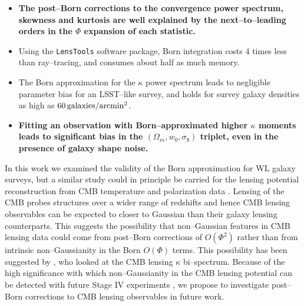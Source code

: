 \documentclass[reprint,aps,prd,superscriptaddress,showkeys,showpacs]{revtex4-1}
\newcommand{\ttt}[1]{\texttt{#1}}
\begin{document}
\begin{itemize}
\item \textbf{\color{blue} The post--Born corrections to the convergence power spectrum, skewness and kurtosis are well explained by the next--to--leading orders in the $\Phi$ expansion of each statistic.} 
\item Using the \ttt{LensTools} software package, Born integration costs 4 times less than ray--tracing, and consumes about half as much memory.
\item The Born approximation for the $\kappa$ power spectrum leads to negligible parameter bias for an LSST--like survey, and holds for survey galaxy densities as high as $60\,{\rm galaxies/arcmin^2}$.
\item \textbf{\color{red} Fitting an observation with Born--approximated higher $\kappa$ moments leads to significant bias in the $(\Omega_m,w_0,\sigma_8)$ triplet, even in the presence of galaxy shape noise.}    
\end{itemize}
%
In this work we examined the validity of the Born approximation for WL galaxy surveys, but a similar study could in principle be carried for the lensing potential reconstruction from CMB temperature and polarization data \citep{CMBCalabrese}. Lensing of the CMB probes structures over a wider range of redshifts and hence CMB lensing observables can be expected to closer to Gaussian than their galaxy lensing counterparts. This suggests the possibility that non--Gaussian features in CMB lensing data could come from post--Born corrections of $O(\Phi^2)$ rather than from intrinsic non--Gaussianity in the Born $O(\Phi)$ terms. This possibility has been suggested by \citep{CMBPrattenLewis}, who looked at the CMB lensing $\kappa$ bi--spectrum. Because of the high significance with which non--Gaussianity in the CMB lensing potential can be detected with future Stage IV experiments \citep{CMBLNG}, we propose to investigate post--Born corrections to CMB lensing observables in future work.  

\end{document}
